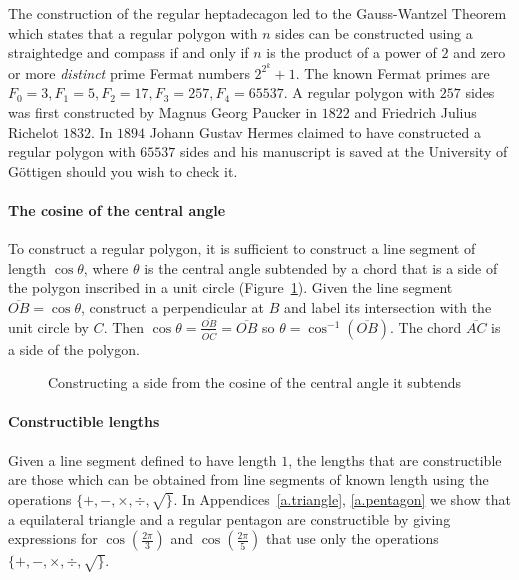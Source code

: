 \documentclass[11pt,a4paper]{article}
\newcommand*{\disfrac}[2]{\displaystyle\frac{#1}{#2}}
\begin{document}
The construction of the regular heptadecagon led to the Gauss-Wantzel Theorem which states that a regular polygon with $n$ sides can be constructed using a straightedge and compass if and only if $n$ is the product of a power of $2$ and zero or more \emph{distinct} prime Fermat numbers $2^{2^k}+1$. The known Fermat primes are $F_0=3, F_1=5, F_2=17, F_3=257, F_4=65537$. A regular polygon with $257$ sides was first constructed by Magnus Georg Paucker in $1822$ and Friedrich Julius Richelot $1832$. In $1894$ Johann Gustav Hermes claimed to have constructed a regular polygon  with $65537$ sides and his manuscript is saved at the University of G\"{o}ttigen should you wish to check it.

\paragraph{The cosine of the central angle}
To construct a regular polygon, it is sufficient to construct a line segment of length $\cos \theta$, where $\theta$ is the central angle subtended by a chord that is a side of the polygon inscribed in a unit circle (Figure~\ref{fig.cosine}). Given the line segment $\overline{OB}=\cos\theta$, construct a perpendicular at $B$ and label its intersection with the unit circle by $C$. Then $\cos \theta=\disfrac{\overline{OB}}{\overline{OC}}=\overline{OB}$ so $\theta = \cos^{-1} (\overline{OB})$. The chord $\overline{AC}$ is a side of the polygon.
\begin{figure}
\begin{center}
\caption{Constructing a side from the cosine of the central angle it subtends}\label{fig.cosine}
\end{center}
\end{figure}

\paragraph{Constructible lengths} Given a line segment defined to have length $1$, the lengths that are constructible are those which can be obtained from line segments of known length using the operations $\{+,-,\times,\div,\surd\}$.
In Appendices~\ref{a.triangle}, \ref{a.pentagon} we show that a equilateral triangle and a regular pentagon are constructible by giving expressions for  $\cos\left(\disfrac{2\pi}{3}\right)$ and $\cos\left(\disfrac{2\pi}{5}\right)$ that use only the operations $\{+,-,\times,\div,\surd\}$.
\end{document}
